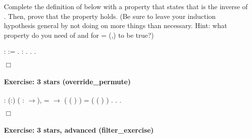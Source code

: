 \documentclass[12pt]{report}
\begin{document}
    Complete the definition of  below with a
    property that states that  is the inverse of
    . Then, prove that the property holds. (Be sure to leave
    your induction hypothesis general by not doing  on more
    things than necessary.  Hint: what property do you need of 
    and  for     = (,) to be true?)  \begin{coqdoccode}
\coqdocemptyline
\coqdocnoindent
{}  :  :=\coqdoceol
\coqdocnoindent
 .\coqdoceol
\coqdocemptyline
\coqdocnoindent
{}  : .\coqdoceol
\coqdocnoindent
{}.\coqdoceol
 .\coqdoceol
\coqdocemptyline
\end{coqdoccode}
\ensuremath{\Box} 

\paragraph{Exercise: 3 stars (override\_permute)}

\begin{coqdoccode}
\coqdocnoindent
{}  : \coqdockw{\ensuremath{\forall}} (:)      ( : \ensuremath{\rightarrow}),\coqdoceol
\coqdocindent{1.00em}
   =  \ensuremath{\rightarrow}\coqdoceol
\coqdocindent{1.00em}
( (   )  )  = ( (   )  ) .\coqdoceol
\coqdocnoindent
{}.\coqdoceol
 .\coqdoceol
\end{coqdoccode}
\ensuremath{\Box} 

\paragraph{Exercise: 3 stars, advanced (filter\_exercise)}
\end{document}
